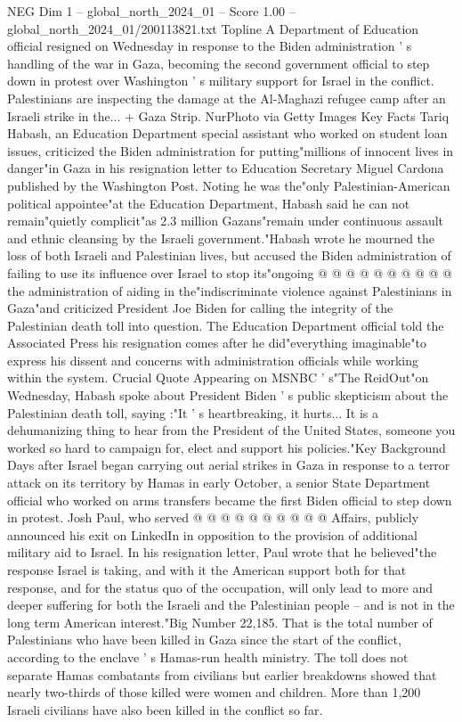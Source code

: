 \begin{textsample}{NEG Dim 1 – global\_north\_2024\_01 – Score 1.00 – global\_north\_2024\_01/200113821.txt}  \label{ex:f1_neg_333}
Topline A Department of Education official resigned on Wednesday in response to the Biden administration ' s handling of the war in Gaza, becoming the second government official to step down in protest over Washington ' s military support for Israel in the conflict.
Palestinians are inspecting the damage at the Al-Maghazi refugee camp after an Israeli strike in the... + Gaza Strip.
NurPhoto via Getty Images Key Facts Tariq Habash, an Education Department special assistant who worked on student loan issues, criticized the Biden administration for putting"millions of innocent lives in danger"in Gaza in his resignation letter to Education Secretary Miguel Cardona published by the Washington Post.
Noting he was the"only Palestinian-American political appointee"at the Education Department, Habash said he can not remain"quietly complicit"as 2.3 million Gazans"remain under continuous assault and ethnic cleansing by the Israeli government."Habash wrote he mourned the loss of both Israeli and Palestinian lives, but accused the Biden administration of failing to use its influence over Israel to stop its"ongoing @ @ @ @ @ @ @ @ @ @ the administration of aiding in the"indiscriminate violence against Palestinians in Gaza"and criticized President Joe Biden for calling the integrity of the Palestinian death toll into question.
The Education Department official told the Associated Press his resignation comes after he did"everything imaginable"to express his dissent and concerns with administration officials while working within the system.
Crucial Quote Appearing on MSNBC ' s"The ReidOut"on Wednesday, Habash spoke about President Biden ' s public skepticism about the Palestinian death toll, saying :"It ' s heartbreaking, it hurts...
It is a dehumanizing thing to hear from the President of the United States, someone you worked so hard to campaign for, elect and support his policies."Key Background Days after Israel began carrying out aerial strikes in Gaza in response to a terror attack on its territory by Hamas in early October, a senior State Department official who worked on arms transfers became the first Biden official to step down in protest.
Josh Paul, who served @ @ @ @ @ @ @ @ @ @ Affairs, publicly announced his exit on LinkedIn in opposition to the provision of additional military aid to Israel.
In his resignation letter, Paul wrote that he believed"the response Israel is taking, and with it the American support both for that response, and for the status quo of the occupation, will only lead to more and deeper suffering for both the Israeli and the Palestinian people -- and is not in the long term American interest."Big Number 22,185.
That is the total number of Palestinians who have been killed in Gaza since the start of the conflict, according to the enclave ' s Hamas-run health ministry.
The toll does not separate Hamas combatants from civilians but earlier breakdowns showed that nearly two-thirds of those killed were women and children.
More than 1,200 Israeli civilians have also been killed in the conflict so far.

\end{textsample}
